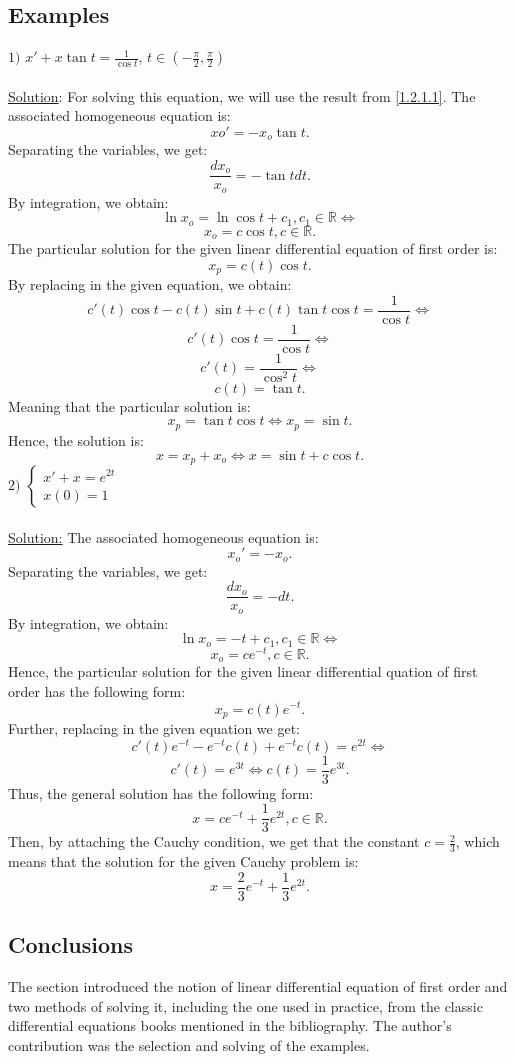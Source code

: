 \documentclass[a4paper,11pt]{report}
\newcommand{\R}{\mathbb{R}}
\begin{document}
\subsection{Examples}
$1)$ $x'+x\tan t=\frac{1}{\cos{t}}$, $t\in (-\frac{\pi}{2},\frac{\pi}{2})$\\\\
\underline{Solution}: For solving this equation, we will use the result from \ref{1.2.1.1}. 
The associated homogeneous equation is: $$x{o}'=-x_{o}\tan t.$$ Separating the variables, we get: $$\frac{dx_{o}}{x_{o}}=-\tan t dt.$$ By integration, we obtain: $$\ln{x_{o}}=\ln{\cos{t}}+c_{1},c_{1}\in\R \Leftrightarrow$$
$$x_{o}=c\cos{t}, c\in\R.$$ 
The particular solution for the given linear differential equation of first order is:
$$x_{p}=c(t)\cos{t}.$$ By replacing in the given equation, we obtain:
$$c'(t)\cos{t}-c(t)\sin{t}+c(t)\tan t\cos{t}=\frac{1}{\cos{t}}\Leftrightarrow$$
$$c'(t)\cos{t}=\frac{1}{\cos{t}}\Leftrightarrow$$
$$c'(t)=\frac{1}{\cos^{2}{t}}\Leftrightarrow$$
$$c(t)=\tan t.$$
Meaning that the particular solution is:
$$x_{p}=\tan t \cos{t} \Leftrightarrow x_{p}=\sin{t}.$$
Hence, the solution is:
$$x=x_{p}+x_{o} \Leftrightarrow x=\sin{t}+c\cos{t}.$$
$2)$ $\begin{cases}
       x'+x=e^{2t}\\
       x(0)=1
      \end{cases}$\\\\
      \underline{Solution:} The associated homogeneous equation is: $$x_{o}'=-x_{o}.$$ Separating the variables, we get: $$\frac{dx_{o}}{x_{o}}=-dt.$$ By integration, we obtain: $$\ln{x_{o}}=-t+c_{1},c_{1}\in\R\Leftrightarrow$$ 
      $$x_{o}=ce^{-t},c\in\R.$$ Hence, the particular solution for the given linear differential quation of first order has the following form: $$x_{p}=c(t)e^{-t}.$$ Further, replacing in the given equation we get: $$c'(t)e^{-t}-e^{-t}c(t)+e^{-t}c(t)=e^{2t}\Leftrightarrow$$
      $$c'(t)=e^{3t}\Leftrightarrow c(t)=\frac{1}{3}e^{3t}.$$
      Thus, the general solution has the following form:
      $$x=ce^{-t}+\frac{1}{3}e^{2t}, c\in \R.$$
      Then, by attaching the Cauchy condition, we get that the constant $c=\frac{2}{3}$, which means that the solution for the given Cauchy problem is: $$x=\frac{2}{3}e^{-t}+\frac{1}{3}e^{2t}.$$

\subsection{Conclusions}
The section introduced the notion of linear differential equation of first order and two methods of solving it, including the one used in practice, from the classic differential equations books mentioned in the bibliography. The author's contribution was the selection and solving of the examples. 
\end{document}

